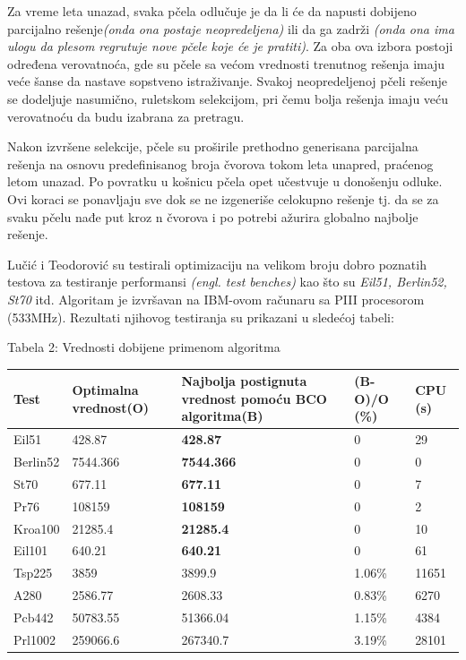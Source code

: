 \documentclass[a4paper]{article}
\begin{document}
{Za vreme leta unazad, svaka pčela odlučuje je da li će da napusti dobijeno parcijalno rešenje{\em{(onda ona postaje neopredeljena)}} ili da ga zadrži {\em{(onda ona ima ulogu da plesom regrutuje nove pčele koje će je pratiti)}}. Za oba ova izbora postoji određena verovatnoća, gde su pčele sa većom vre\-dnosti trenutnog rešenja imaju veće šanse da nastave sopstveno istraživa\-nje. Svakoj neopredeljenoj pčeli rešenje se dodeljuje nasumično, ruletskom selekcijom, pri čemu bolja rešenja imaju veću verovatnoću da budu izabrana za pretragu.

Nakon izvršene selekcije, pčele su proširile prethodno generisana parcijalna rešenja na osnovu predefinisanog broja čvorova tokom leta unapred, praćenog letom unazad. Po povratku u košnicu pčela opet učestvuje u donošenju odluke. Ovi koraci se ponavljaju sve dok se ne izgeneriše celokupno rešenje tj. da se za svaku pčelu nađe put kroz n čvorova i po potrebi ažurira globalno najbolje rešenje\cite{primena}.

Lučić i Teodorović su testirali optimizaciju na velikom broju dobro poznatih testova za testiranje performansi {\em (engl. test benches)} kao što su {\em Eil51, Berlin52, St70} itd\cite{test}. Algoritam je izvršavan na IBM-ovom računaru sa PIII procesorom (533MHz). Rezultati njihovog testiranja su prikazani u sledećoj tabeli: 

\begin{center}
Tabela 2: Vrednosti dobijene primenom algoritma \cite{test} 
\begin{tabular}{|p{1.2cm}|p{2cm}|p{2cm}|p{1.4cm}|p{1cm}|}
 \hline
Test & Optimalna vrednost(O) & Najbolja postignuta vrednost pomoću BCO algoritma(B)& (B-O)/O (\%) &CPU (s) \\ \hline
Eil51&428.87&{\textbf{428.87}}&0&29\\ \hline
Berlin52&7544.366&{\textbf{7544.366}}&0&0\\ \hline
St70&677.11&{\textbf{677.11}}&0&7\\ \hline
Pr76&108159&{\textbf{108159}}&0&2\\ \hline
Kroa100&21285.4&{\textbf{21285.4}}&0&10\\ \hline
Eil101&640.21&{\textbf{640.21}}&0&61\\ \hline
Tsp225&3859&3899.9&1.06\%&11651\\ \hline
A280&2586.77&2608.33&0.83\%&6270\\ \hline
Pcb442&50783.55&51366.04&1.15\%&4384\\ \hline
Prl1002&259066.6&267340.7&3.19\%&28101\\ \hline
\end{tabular}\par
\bigskip


\end{center}}
\end{document}
